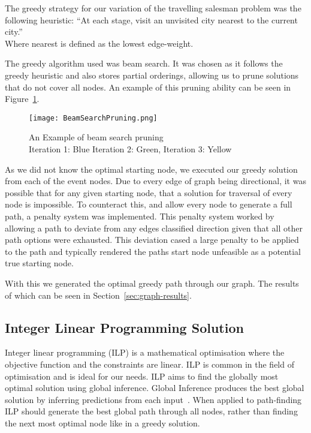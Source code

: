 \documentclass[bsc,frontabs,twoside,singlespacing,parskip,deptreport]{infthesis}     %
\begin{document}
The greedy strategy for our variation of the travelling salesman problem was the following heuristic:
``At each stage, visit an unvisited city nearest to the current city.''\\
Where nearest is defined as the lowest edge-weight.


The greedy algorithm used was beam search.
It was chosen as it follows the greedy heuristic and also stores partial orderings,
allowing us to prune solutions that do not cover all nodes.
An example of this pruning ability can be seen in Figure~\ref{fig:beam-prune}.

\begin{figure}[H]
  \centering
  \texttt{[image: BeamSearchPruning.png]}
  \caption{An Example of beam search pruning\\ Iteration 1: Blue Iteration 2: Green, Iteration 3: Yellow}
  \label{fig:beam-prune}
\end{figure}

As we did not know the optimal starting node, we executed our greedy solution from each of the event nodes.
Due to every edge of graph being directional, it was possible that for any given starting node, that a solution for traversal
of every node is impossible. To counteract this, and allow every node to generate a full path, a penalty system was implemented.
This penalty system worked by allowing a path to deviate from any edges classified direction given that all other path options
were exhausted. This deviation cased a large penalty to be applied to the path and typically rendered the paths start node
unfeasible as a potential true starting node. 

With this we generated the optimal greedy path through our graph. The results of which can be seen in Section~\ref{sec:graph-results}.

\subsection{Integer Linear Programming Solution}
Integer linear programming (ILP) is a mathematical optimisation where the objective function and the constraints are linear.
ILP is common in the field of optimisation and is ideal for our needs. ILP aims to find the globally most optimal solution using global inference.
Global Inference produces the best global solution by inferring predictions from each input~\cite{roth2004linear}.%
When applied to path-finding ILP should generate the best global path through all nodes, rather than finding the next most optimal node like in a greedy solution.
\end{document}
